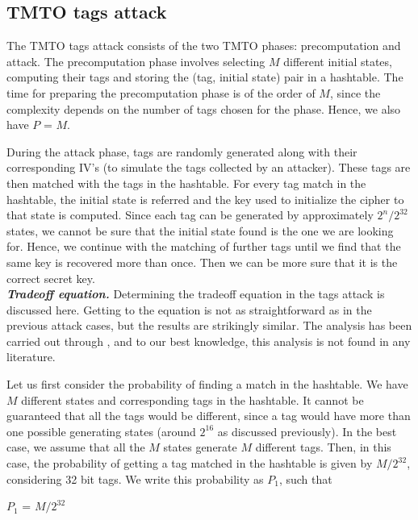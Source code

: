 \subsection{TMTO tags attack}

The TMTO tags attack consists of the two TMTO phases: precomputation and attack. The precomputation phase involves selecting $M$ different initial states, computing their tags and storing the (tag, initial state) pair in a hashtable. The time for preparing the precomputation phase is of the order of $M$, since the complexity depends on the number of tags chosen for the phase. Hence, we also have $P$ = $M$.

During the attack phase, tags are randomly generated along with their corresponding IV's (to simulate the tags collected by an attacker). These tags are then matched with the tags in the hashtable. For every tag match in the hashtable, the initial state is referred and the key used to initialize the cipher to that state is computed. Since each tag can be generated by approximately $2^n/2^{32}$ states, we cannot be sure that the initial state found is the one we are looking for. Hence, we continue with the matching of further tags until we find that the same key is recovered more than once. Then we can be more sure that it is the correct secret key.\\

\noindent \textit{\textbf{Tradeoff equation.}} Determining the tradeoff equation in the tags attack is discussed here. Getting to the equation is not as straightforward as in the previous attack cases, but the results are strikingly similar. The analysis has been carried out through \cite{erik-discussions}, and to our best knowledge, this analysis is not found in any literature.

Let us first consider the probability of finding a match in the hashtable. We have $M$ different states and corresponding tags in the hashtable. It cannot be guaranteed that all the tags would be different, since a tag would have more than one possible generating states (around $2^{16}$ as discussed previously). In the best case, we assume that all the $M$ states generate $M$ different tags. Then, in this case, the probability of getting a tag matched in the hashtable is given by $M/2^{32}$, considering 32 bit tags. We write this probability as $P_1$, such that

\begin{center}
$P_1$ = $M/2^{32}$
\end{center}


